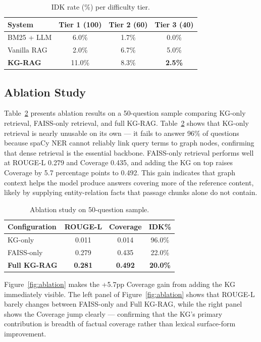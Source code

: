 \documentclass[conference]{IEEEtran}
\begin{document}
\begin{table}[h]
\centering
\caption{IDK rate (\%) per difficulty tier.}
\label{tab:tier}
\begin{tabular}{lccc}
\hline
\textbf{System} & \textbf{Tier 1 (100)} & \textbf{Tier 2 (60)} & \textbf{Tier 3 (40)} \\
\hline
BM25 + LLM      & 6.0\%  & 1.7\% & 0.0\% \\
Vanilla RAG     & 2.0\%  & 6.7\% & 5.0\% \\
\textbf{KG-RAG} & 11.0\% & 8.3\% & \textbf{2.5\%} \\
\hline
\end{tabular}
\end{table}

\subsection{Ablation Study}

Table~\ref{tab:ablation} presents ablation results on a 50-question sample comparing KG-only retrieval, FAISS-only retrieval, and full KG-RAG. Table~\ref{tab:ablation} shows that KG-only retrieval is nearly unusable on its own — it fails to answer 96\% of questions because spaCy NER cannot reliably link query terms to graph nodes, confirming that dense retrieval is the essential backbone. FAISS-only retrieval performs well at ROUGE-L 0.279 and Coverage 0.435, and adding the KG on top raises Coverage by 5.7 percentage points to 0.492. This gain indicates that graph context helps the model produce answers covering more of the reference content, likely by supplying entity-relation facts that passage chunks alone do not contain.

\begin{table}[h]
\centering
\caption{Ablation study on 50-question sample.}
\label{tab:ablation}
\begin{tabular}{lccc}
\hline
\textbf{Configuration} & \textbf{ROUGE-L} & \textbf{Coverage} & \textbf{IDK\%} \\
\hline
KG-only              & 0.011 & 0.014 & 96.0\% \\
FAISS-only           & 0.279 & 0.435 & 22.0\% \\
\textbf{Full KG-RAG} & \textbf{0.281} & \textbf{0.492} & \textbf{20.0\%} \\
\hline
\end{tabular}
\end{table}

Figure~\ref{fig:ablation} makes the +5.7pp Coverage gain from adding the KG immediately visible. The left panel of Figure~\ref{fig:ablation} shows that ROUGE-L barely changes between FAISS-only and Full KG-RAG, while the right panel shows the Coverage jump clearly — confirming that the KG's primary contribution is breadth of factual coverage rather than lexical surface-form improvement.
\end{document}

